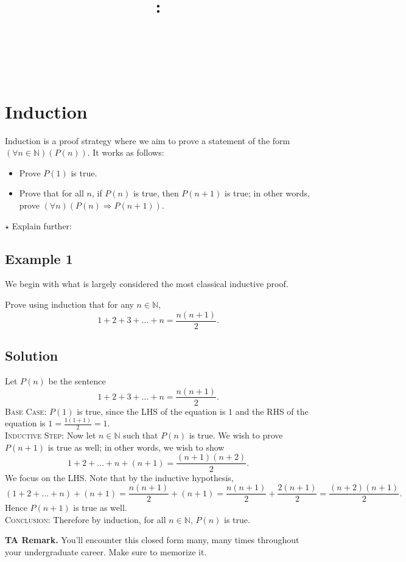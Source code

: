 \documentclass{article}
\title{
    \vspace{2in}
    \textbf{\lectClass:\\ \lectTitle}\\
    \vspace{0.1in}\large{\textit{\lectClassInstructor\ \lectSection}}
    \vspace{3in}
    \author{\textbf{\lectAuthorName}}
    \date{}
}
\begin{document}
\maketitle
\pagebreak

\section*{Induction}
    Induction is a proof strategy where we aim to prove a statement of the form $(\forall n \in \mathbb{N})(P(n))$. It works as follows:
    \begin{itemize}
        \item Prove $P(1)$ is true.
        \item Prove that for all $n$, if $P(n)$ is true, then $P(n + 1)$ is true; in other words, prove $(\forall n)(P(n) \Rightarrow P(n + 1))$.
    \end{itemize}
    
    $\star$ Explain further:

\subsection*{Example 1}
    We begin with what is largely considered the most classical inductive proof.
    
    Prove using induction that for any $n \in \mathbb{N}$, $$1 + 2 + 3 + \dots + n = \frac{n(n + 1)}{2}.$$

\subsection*{Solution}
    Let $P(n)$ be the sentence $$1 + 2 + 3 + \dots + n = \frac{n(n + 1)}{2}.$$
    \textsc{Base Case}: $P(1)$ is true, since the LHS of the equation is $1$ and the RHS of the equation is $1 = \frac{1(1 + 1)}{2} = 1.$ \\
    \textsc{Inductive Step}: Now let $n \in \mathbb{N}$ such that $P(n)$ is true. We wish to prove $P(n + 1)$ is true as well; in other words, we wish to show $$1 + 2 + \dots + n + (n + 1) = \frac{(n + 1)(n + 2)}{2}.$$ We focus on the LHS. Note that by the inductive hypothesis, $$(1 + 2 + \dots + n) + (n + 1) = \frac{n(n + 1)}{2} + (n + 1) = \frac{n(n + 1)}{2} + \frac{2(n + 1)}{2} = \frac{(n + 2)(n + 1)}{2}.$$
    Hence $P(n + 1)$ is true as well. \\
    \textsc{Conclusion}: Therefore by induction, for all $n \in \mathbb{N}$, $P(n)$ is true.
    
    \vspace{1.5mm}
    \textbf{TA Remark.} You'll encounter this closed form many, many times throughout your undergraduate career. Make sure to memorize it.
\end{document}
